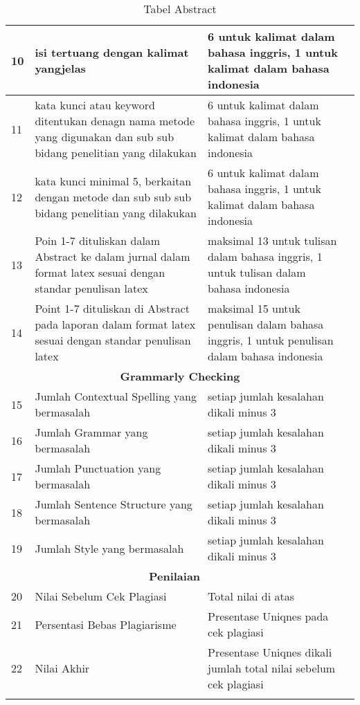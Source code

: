 \begin{longtable}{|p{}|p{}|p{}|p{}|}
10 &isi tertuang dengan kalimat yangjelas&6 untuk kalimat dalam bahasa inggris, 1 untuk kalimat dalam bahasa indonesia& \\ \hline

11 &kata kunci atau keyword ditentukan denagn nama metode yang digunakan dan sub sub bidang penelitian yang dilakukan&6 untuk kalimat dalam bahasa inggris, 1 untuk kalimat dalam bahasa indonesia& \\ \hline

12 &kata kunci minimal 5, berkaitan dengan metode dan sub sub sub bidang penelitian yang dilakukan&6 untuk kalimat dalam bahasa inggris, 1 untuk kalimat dalam bahasa indonesia& \\ \hline

13 &Poin 1-7 dituliskan dalam Abstract ke dalam jurnal dalam format latex sesuai dengan standar penulisan latex&maksimal 13 untuk tulisan dalam bahasa inggris, 1 untuk tulisan dalam bahasa indonesia& \\ \hline

14 &Point 1-7 dituliskan di Abstract pada laporan dalam format latex sesuai dengan standar penulisan latex&maksimal 15 untuk penulisan dalam bahasa inggris, 1 untuk penulisan dalam bahasa indonesia& \\ \hline


\multicolumn{4}{c}{\textbf{Grammarly Checking}}\\ \hline

15 &Jumlah Contextual Spelling yang bermasalah&setiap jumlah kesalahan dikali minus 3& \\ \hline

16 &Jumlah Grammar yang bermasalah&setiap jumlah kesalahan dikali minus 3& \\ \hline

17 &Jumlah Punctuation yang bermasalah&setiap jumlah kesalahan dikali minus 3& \\ \hline

18 &Jumlah Sentence Structure yang bermasalah&setiap jumlah kesalahan dikali minus 3& \\ \hline

19 &Jumlah Style yang bermasalah&setiap jumlah kesalahan dikali minus 3& \\ \hline

\multicolumn{3}{c}{\textbf{Penilaian}}\\ \hline

20 &Nilai Sebelum Cek Plagiasi&Total nilai di atas& \\ \hline

21 &Persentasi Bebas Plagiarisme&Presentase Uniqnes pada cek plagiasi& \\ \hline

22 &Nilai Akhir&Presentase Uniqnes dikali jumlah total nilai sebelum cek plagiasi& \\ \hline

\caption{Tabel Abstract}
\label{table:Abstract}
\end{longtable}
